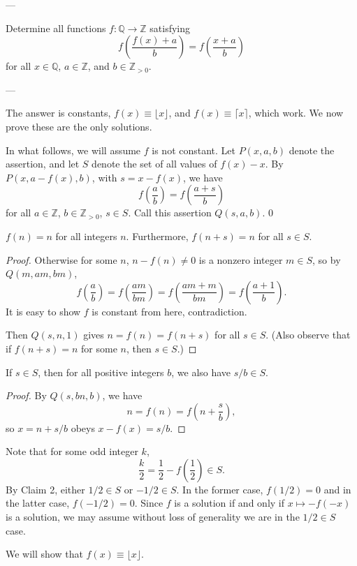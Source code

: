 
---

Determine all functions $f:\mathbb Q\to\mathbb Z$ satisfying
\[f\left(\frac{f(x)+a}b\right)=f\left(\frac{x+a}b\right)\]
for all $x\in\mathbb Q$, $a\in\mathbb Z$, and $b\in\mathbb Z_{>0}$.

---

The answer is constants, $f(x)\equiv\lfloor x\rfloor$, and $f(x)\equiv\lceil x\rceil$, which work. We now prove these are the only solutions.

In what follows, we will assume $f$ is not constant. Let $P(x,a,b)$ denote the assertion, and let $S$ denote the set of all values of $f(x)-x$. By $P(x,a-f(x),b)$, with $s=x-f(x)$, we have
\[\boxed{f\left(\frac ab\right)=f\left(\frac{a+s}b\right)}\]
for all $a\in\mathbb Z$, $b\in\mathbb Z_{>0}$, $s\in S$. Call this assertion $Q(s,a,b)$.
\setcounter{claim}0
\begin{claim}
    $f(n)=n$ for all integers $n$. Furthermore, $f(n+s)=n$ for all $s\in S$.
\end{claim}
\begin{proof}
    Otherwise for some $n$, $n-f(n)\ne0$ is a nonzero integer $m\in S$, so by $Q(m,am,bm)$,
    \[f\left(\frac ab\right)=f\left(\frac{am}{bm}\right)=f\left(\frac{am+m}{bm}\right)=f\left(\frac{a+1}b\right).\]
    It is easy to show $f$ is constant from here, contradiction.

    Then $Q(s,n,1)$ gives $n=f(n)=f(n+s)$ for all $s\in S$. (Also observe that if $f(n+s)=n$ for some $n$, then $s\in S$.)
\end{proof}
\begin{claim}
    If $s\in S$, then for all positive integers $b$, we also have $s/b\in S$.
\end{claim}
\begin{proof}
    By $Q(s,bn,b)$, we have
    \[n=f(n)=f\left(n+\frac sb\right),\]
    so $x=n+s/b$ obeys $x-f(x)=s/b$.
\end{proof}

Note that for some odd integer $k$,
\[\frac k2=\frac12-f\left(\frac12\right)\in S.\]
By Claim 2, either $1/2\in S$ or $-1/2\in S$. In the former case, $f(1/2)=0$ and in the latter case, $f(-1/2)=0$. Since $f$ is a solution if and only if $x\mapsto-f(-x)$ is a solution, we may assume without loss of generality we are in the $1/2\in S$ case.

We will show that $f(x)\equiv\lfloor x\rfloor$.

